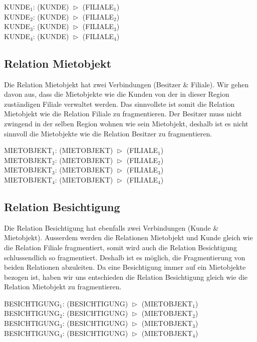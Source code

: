 \documentclass[11pt,a4paper,parskip=half]{scrartcl}
\begin{document}
KUNDE$_1$: (KUNDE)  $\vartriangleright$ (FILIALE$_1$)\\
KUNDE$_2$: (KUNDE)  $\vartriangleright$ (FILIALE$_2$)\\
KUNDE$_3$: (KUNDE)  $\vartriangleright$ (FILIALE$_3$)\\
KUNDE$_4$: (KUNDE)  $\vartriangleright$ (FILIALE$_4$)

\subsection{Relation Mietobjekt}
Die Relation Mietobjekt hat zwei Verbindungen (Besitzer \& Filiale). Wir gehen davon aus, dass die Mietobjekte wie die Kunden von der in dieser Region zuständigen Filiale verwaltet werden. Das sinnvollste ist somit die Relation Mietobjekt wie die Relation Filiale zu fragmentieren. Der Besitzer muss nicht zwingend in der selben Region wohnen wie sein Mietobjekt, deshalb ist es nicht sinnvoll die Mietobjekte wie die Relation Besitzer zu fragmentieren.

MIETOBJEKT$_1$: (MIETOBJEKT) $\vartriangleright$ (FILIALE$_1$)\\
MIETOBJEKT$_2$: (MIETOBJEKT) $\vartriangleright$ (FILIALE$_2$)\\
MIETOBJEKT$_3$: (MIETOBJEKT) $\vartriangleright$ (FILIALE$_3$)\\
MIETOBJEKT$_4$: (MIETOBJEKT) $\vartriangleright$ (FILIALE$_4$)

\subsection{Relation Besichtigung}
Die Relation Besichtigung hat ebenfalls zwei Verbindungen (Kunde \& Mietobjekt). Ausserdem werden die Relationen Mietobjekt und Kunde gleich wie die Relation Filiale fragmentiert, somit wird auch die Relation Besichtigung schlussendlich so fragmentiert. Deshalb ist es möglich, die Fragmentierung von beiden Relationen abzuleiten. Da eine Besichtigung immer auf ein Mietobjekte bezogen ist, haben wir uns entschieden die Relation Besichtigung gleich wie die Relation Mietobjekt zu fragmentieren.

BESICHTIGUNG$_1$: (BESICHTIGUNG) $\vartriangleright$ (MIETOBJEKT$_1$)\\
BESICHTIGUNG$_2$: (BESICHTIGUNG) $\vartriangleright$ (MIETOBJEKT$_2$)\\
BESICHTIGUNG$_3$: (BESICHTIGUNG) $\vartriangleright$ (MIETOBJEKT$_3$)\\
BESICHTIGUNG$_4$: (BESICHTIGUNG) $\vartriangleright$ (MIETOBJEKT$_4$)
\end{document}
